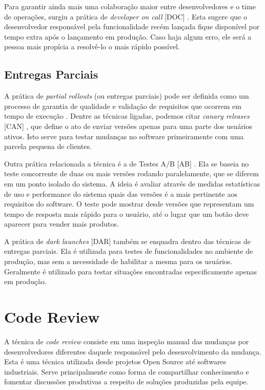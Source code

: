 Para garantir ainda mais uma colaboração maior entre desenvolvedores e o time de operações, surgiu a prática de \emph{developer on call} [DOC] \cite{devAndDeploymentFB}. Esta sugere que o desenvolvedor responsável pela funcionalidade recém lançada fique disponível por tempo extra após o lançamento em produção. Caso haja algum erro, ele será a pessoa mais propícia a resolvê-lo o mais rápido possível.

\subsection{Entregas Parciais}

A prática de \emph{partial rollouts} (ou entregas parciais) pode ser definida como um processo de garantia de qualidade e validação de requisitos que ocorrem em tempo de execução \cite{empiricalStudy2016}. Dentre as técnicas ligadas, podemos citar \emph{canary releases} [CAN] \cite{continuousDeliveryBook}, que define o ato de enviar versões apenas para uma parte dos usuários ativos. Isto serve para testar mudanças no software primeiramente com uma parcela pequena de clientes.

Outra prática relacionada a técnica é a de Testes A/B [AB] \cite{testsAB}. Ela se baseia no teste concorrente de duas ou mais versões rodando paralelamente, que se diferem em um ponto isolado do sistema. A ideia é avaliar através de medidas estatísticas de uso e performance do sistema quais das versões é a mais pertinente aos requisitos do software. O teste pode mostrar desde versões que representam um tempo de resposta mais rápido para o usuário, até o lugar que um botão deve aparecer para vender mais produtos.

A prática de \emph{dark launches} [DAR] \cite{devAndDeploymentFB} também se enquadra dentro das técnicas de entregas parciais. Ela é utilizada para testes de funcionalidades no ambiente de produção, mas sem a necessidade de habilitar a mesma para os usuários. Geralmente é utilizado para testar situações encontradas especificamente apenas em produção.  


\section{Code Review}

A técnica de \emph{code review} \cite{codeReview} consiste em uma inspeção manual das mudanças por desenvolvedores diferentes daquele responsável pelo desenvolvimento da mudança. Esta é uma técnica utilizada desde projetos Open Source até softwares industriais. Serve principalmente como forma de compartilhar conhecimento e fomentar discussões produtivas a respeito de soluções produzidas pela equipe.

